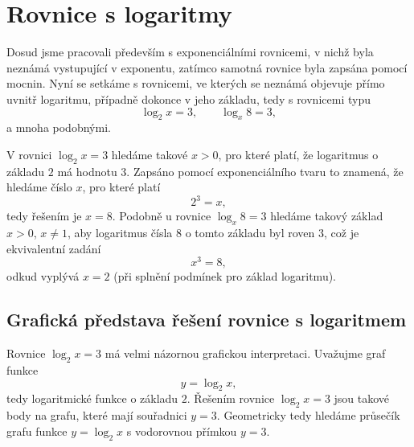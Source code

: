 \documentclass[12pt,a4paper]{article}
\begin{document}
\section{Rovnice s logaritmy}

Dosud jsme pracovali především s exponenciálními rovnicemi, v nichž byla neznámá
vystupující v exponentu, zatímco samotná rovnice byla zapsána pomocí mocnin. Nyní
se setkáme s rovnicemi, ve kterých se neznámá objevuje přímo uvnitř logaritmu, případně
dokonce v jeho základu, tedy s rovnicemi typu
\[
\log_2 x = 3,\qquad \log_x 8 = 3,
\]
a mnoha podobnými.

V rovnici $\log_2 x = 3$ hledáme takové $x>0$, pro které platí, že logaritmus o základu
$2$ má hodnotu $3$. Zapsáno pomocí exponenciálního tvaru to znamená, že hledáme
číslo $x$, pro které platí
\[
2^3 = x,
\]
tedy řešením je $x = 8$. Podobně u rovnice $\log_x 8 = 3$ hledáme takový základ $x>0$,
$x \neq 1$, aby logaritmus čísla $8$ o tomto základu byl roven $3$, což je ekvivalentní
zadání
\[
x^3 = 8,
\]
odkud vyplývá $x = 2$ (při splnění podmínek pro základ logaritmu).

\subsection*{Grafická představa řešení rovnice s logaritmem}

Rovnice $\log_2 x = 3$ má velmi názornou grafickou interpretaci. Uvažujme graf
funkce
\[
y = \log_2 x,
\]
tedy logaritmické funkce o základu $2$. Řešením rovnice $\log_2 x = 3$ jsou takové body
na grafu, které mají souřadnici $y = 3$. Geometricky tedy hledáme průsečík grafu
funkce $y = \log_2 x$ s vodorovnou přímkou $y = 3$.

\begin{center}
\end{center}
\end{document}
